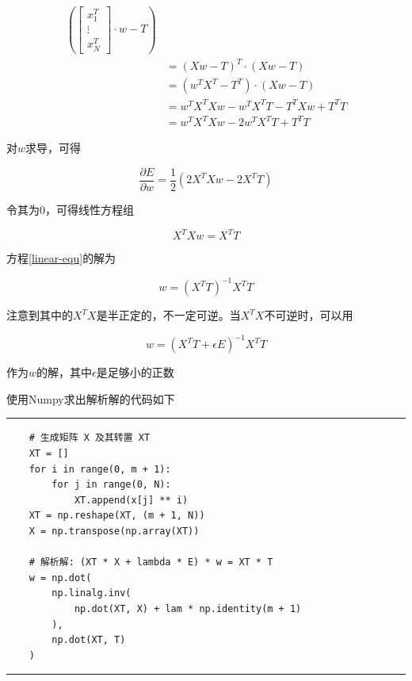 \begin{align}
                \left(
                \begin{bmatrix}
                    x_1^T \\ \vdots \\ x_N^T    
                \end{bmatrix}
                \cdot
                w - T
                \right) \\
            &=  \left(
                    X w - T
                \right)^T
                \cdot
                \left(
                    X w - T
                \right) \\
            &=  \left(
                    w^T X^T - T^T
                \right)
                \cdot
                \left(
                    X w - T
                \right) \\
            &=  w^T X^T X w - w^T X^T T - T^T X w + T^T T \\
            &=  w^T X^T X w - 2 w^T X^T T + T^T T
\end{align}

对$w$求导，可得

\begin{equation}
    \frac{\partial E}{\partial w} = \frac{1}{2} \left( 2 X^T X w - 2 X^T T \right)
\end{equation}

令其为$0$，可得线性方程组

\begin{equation}
    X^T X w = X^T T
    \label{linear-equ}
\end{equation}

方程\eqref{linear-equ}的解为

\begin{equation}
    w = \left( X^T T \right)^{-1} X^T T
\end{equation}

注意到其中的$X^T X$是半正定的，不一定可逆。当$X^T X$不可逆时，可以用

\begin{equation}
    w = \left( X^T T + \epsilon E \right)^{-1} X^T T
\end{equation}

作为$w$的解，其中$\epsilon$是足够小的正数

使用Numpy求出解析解的代码如下

\rule{\textwidth}{0.01em}
\begin{verbatim}
    # 生成矩阵 X 及其转置 XT
    XT = []
    for i in range(0, m + 1):
        for j in range(0, N):
            XT.append(x[j] ** i)
    XT = np.reshape(XT, (m + 1, N))
    X = np.transpose(np.array(XT))

    # 解析解: (XT * X + lambda * E) * w = XT * T
    w = np.dot(
        np.linalg.inv(
            np.dot(XT, X) + lam * np.identity(m + 1)
        ),
        np.dot(XT, T)
    )
\end{verbatim}
\rule{\textwidth}{0.01em}

